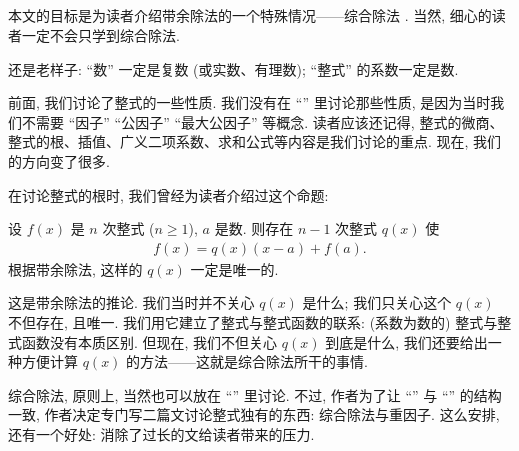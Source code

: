 \subsection*{\SyntheticDivision}
\markright{\SyntheticDivision}

本文的目标是为读者介绍带余除法的一个特殊情况——综合除法 . 当然, 细心的读者一定不会只学到综合除法.

还是老样子: ``数'' 一定是复数 (或实数、有理数); ``整式'' 的系数一定是数.

前面, 我们讨论了整式的一些性质. 我们没有在 ``\HEADING'' 里讨论那些性质, 是因为当时我们不需要 ``因子'' ``公因子'' ``最大公因子'' 等概念. 读者应该还记得, 整式的微商、整式的根、插值、广义二项系数、求和公式等内容是我们讨论的重点. 现在, 我们的方向变了很多.

在讨论整式的根时, 我们曾经为读者介绍过这个命题:
\begin{proposition}
    设 $f(x)$ 是 $n$ 次整式 ($n \geq 1$), $a$ 是数. 则存在 $n-1$ 次整式 $q(x)$ 使
    \begin{align*}
        f(x) = q(x) (x-a) + f(a).
    \end{align*}
    根据带余除法, 这样的 $q(x)$ 一定是唯一的.
\end{proposition}

这是带余除法的推论. 我们当时并不关心 $q(x)$ 是什么; 我们只关心这个 $q(x)$ 不但存在, 且唯一. 我们用它建立了整式与整式函数的联系: (系数为数的) 整式与整式函数没有本质区别. 但现在, 我们不但关心 $q(x)$ 到底是什么, 我们还要给出一种方便计算 $q(x)$ 的方法——这就是综合除法所干的事情.

综合除法, 原则上, 当然也可以放在 ``\SomePropertiesOfPolynomials'' 里讨论. 不过, 作者为了让 ``\SomePropertiesOfIntegers'' 与 ``\SomePropertiesOfPolynomials'' 的结构一致, 作者决定专门写二篇文讨论整式独有的东西: 综合除法与重因子. 这么安排, 还有一个好处: 消除了过长的文给读者带来的压力.

